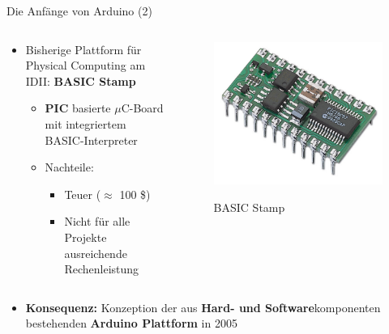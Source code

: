\documentclass{beamer}
\begin{document}
\begin{frame}{Die Anf\"ange von Arduino (2)}
\begin{columns}
	\begin{column}{0.7\textwidth}
	\begin{itemize}
		\item Bisherige Plattform f\"ur Physical Computing am IDII: \textbf{BASIC Stamp}
		\begin{itemize}
			\item \textbf{PIC} basierte $\mu{}$C-Board mit integriertem BASIC-Interpreter
			\item Nachteile:
			\begin{itemize}
				\item Teuer ($\approx$ 100 \$)
				\item Nicht f\"ur alle Projekte ausreichende Rechenleistung
			\end{itemize}
		\end{itemize}
	\end{itemize}
	\end{column}
	\begin{column}{0.3\textwidth}
		\begin{figure}[H]
			\centering
			\includegraphics[width=1.0\textwidth]{./images/basic-stamp.jpg}
			\label{fig:basic-stamp}
			\caption{BASIC Stamp\cite{Image:BasicSTAMP}}
		\end{figure}
	\end{column}
\end{columns}
\vspace{20px}
\begin{itemize}
	\item \textbf{Konsequenz:} Konzeption der aus \textbf{Hard- und Software}komponenten bestehenden \textbf{Arduino Plattform} in 2005
\end{itemize}
\end{frame}
\end{document}
